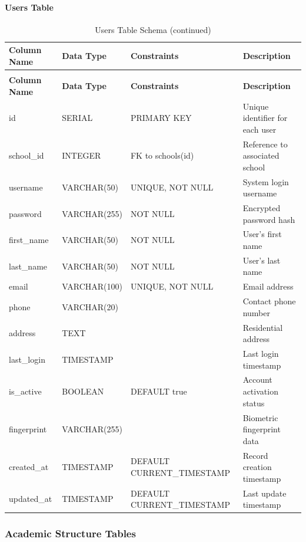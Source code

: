 \documentclass[12pt,a4paper]{report}
\begin{document}
\paragraph{Users Table}
\begin{longtable}{|p{3cm}|p{3cm}|p{2cm}|p{6cm}|}
\caption{Users Table Schema}
\label{tab:users}\\
\hline
\textbf{Column Name} & \textbf{Data Type} & \textbf{Constraints} & \textbf{Description} \\
\hline
\endfirsthead
\caption[]{Users Table Schema (continued)}\\
\hline
\textbf{Column Name} & \textbf{Data Type} & \textbf{Constraints} & \textbf{Description} \\
\hline
\endhead
id & SERIAL & PRIMARY KEY & Unique identifier for each user \\
\hline
school\_id & INTEGER & FK to schools(id) & Reference to associated school \\
\hline
username & VARCHAR(50) & UNIQUE, NOT NULL & System login username \\
\hline
password & VARCHAR(255) & NOT NULL & Encrypted password hash \\
\hline
first\_name & VARCHAR(50) & NOT NULL & User's first name \\
\hline
last\_name & VARCHAR(50) & NOT NULL & User's last name \\
\hline
email & VARCHAR(100) & UNIQUE, NOT NULL & Email address \\
\hline
phone & VARCHAR(20) & & Contact phone number \\
\hline
address & TEXT & & Residential address \\
\hline
last\_login & TIMESTAMP & & Last login timestamp \\
\hline
is\_active & BOOLEAN & DEFAULT true & Account activation status \\
\hline
fingerprint & VARCHAR(255) & & Biometric fingerprint data \\
\hline
created\_at & TIMESTAMP & DEFAULT CURRENT\_TIMESTAMP & Record creation timestamp \\
\hline
updated\_at & TIMESTAMP & DEFAULT CURRENT\_TIMESTAMP & Last update timestamp \\
\hline
\end{longtable}

\subsubsection{Academic Structure Tables}
\end{document}

